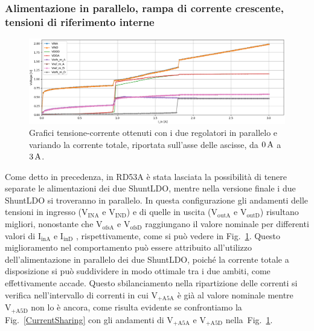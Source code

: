 % 
%

\subsubsection{Alimentazione in parallelo, rampa di corrente crescente, tensioni di riferimento interne} 

\begin{figure}[t]
\centering
\includegraphics[width=\textwidth]{Immagini/PUI}
\caption{Grafici tensione-corrente ottenuti con i due regolatori in parallelo e variando la corrente totale, riportata sull'asse delle ascisse, da $0\rm \, A$ a $3\rm \, A$.}
\label{PUI}
\end{figure}
Come detto in precedenza, in RD53A è stata lasciata la possibilità di tenere separate le alimentazioni dei due ShuntLDO, mentre nella versione finale i due ShuntLDO si troveranno in parallelo. 
In questa configurazione gli andamenti delle tensioni in ingresso ($\mathrm{V_{INA}}$ e $\mathrm{V_{IND}}$) e di quelle in uscita ($\mathrm{V_{outA}}$ e $\mathrm{V_{outD}}$) risultano migliori, nonostante che $\mathrm{V_{ofsA}}$ e $\mathrm{V_{ofsD}}$ raggiungano il valore nominale per differenti valori di $\mathrm{I_{inA}}$ e $\mathrm{I_{inD}}$ , rispettivamente, come si può vedere in Fig.~\ref{PUI}.
Questo miglioramento nel comportamento può essere attribuito all'utilizzo dell'alimentazione in parallelo dei due ShuntLDO, poiché la corrente totale a disposizione si può suddividere in modo ottimale tra i due ambiti, come effettivamente accade. Questo sbilanciamento nella ripartizione delle correnti si verifica nell'intervallo di correnti in cui $\mathrm{V_{+A5A}}$ \`e gi\`a al valore nominale mentre $\mathrm{V_{+A5D}}$ non lo \`e ancora, come risulta evidente se confrontiamo la Fig.~\ref{CurrentSharing} con gli andamenti di $\mathrm{V_{+A5A}}$ e $\mathrm{V_{+A5D}}$ nella~Fig.~\ref{PUI}.

